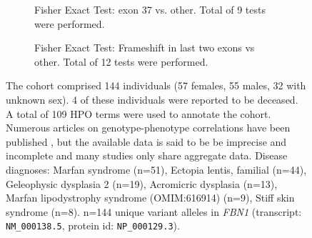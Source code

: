 \begin{figure}[htbp]
\begin{subfigure}[b]{0.95\textwidth}
\centering
{}
\captionsetup{justification=raggedright,singlelinecheck=false}
\caption{Fisher Exact Test:  exon 37 vs. other. Total of  9 tests were performed. }
\end{subfigure}
\begin{subfigure}[b]{0.95\textwidth}
\centering
{}
\captionsetup{justification=raggedright,singlelinecheck=false}
\caption{Fisher Exact Test: Frameshift in last two exons vs other. Total of  12 tests were performed. }
\end{subfigure}
\caption{The cohort comprised 144 individuals (57 females, 55 males, 32 with unknown sex). 
4 of these individuals were reported to be deceased. A total of 109 HPO terms were used to annotate the cohort. 
Numerous articles on genotype-phenotype correlations have been published \cite{PMID_29357934,PMID_33731877,PMID_33174221}, 
but the available data is said to be be imprecise and incomplete \cite{PMID_27906200} and many studies only share aggregate data.
Disease diagnoses: Marfan syndrome (n=51), Ectopia lentis, familial (n=44), Geleophysic dysplasia 2 (n=19), 
Acromicric dysplasia  (n=13), Marfan lipodystrophy syndrome (OMIM:616914) (n=9), Stiff skin syndrome  (n=8).  
n=144 unique variant alleles in \textit{FBN1} (transcript: \texttt{NM\_000138.5}, protein id: \texttt{NP\_000129.3}).}
\end{figure}
